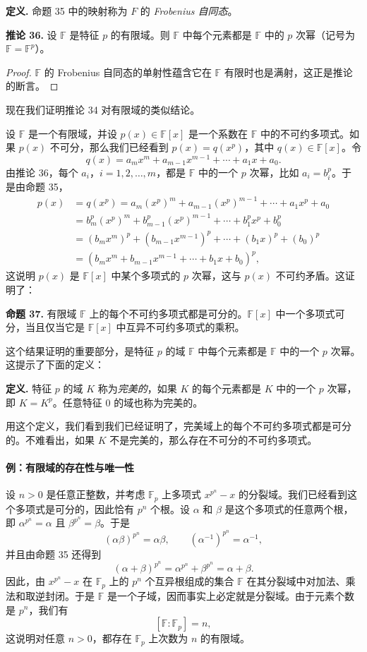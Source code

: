 \noindent\textbf{定义.} 命题 35 中的映射称为 $F$ 的 \emph{Frobenius 自同态}。

\noindent\textbf{推论 36.} 设 $\mathbb F$ 是特征 $p$ 的有限域。则 $\mathbb F$ 中每个元素都是 $\mathbb F$ 中的 $p$ 次幂（记号为 $\mathbb F=\mathbb F^p$）。

\begin{proof}
	$\mathbb F$ 的 Frobenius 自同态的单射性蕴含它在 $\mathbb F$ 有限时也是满射，这正是推论的断言。
\end{proof}

现在我们证明推论 34 对有限域的类似结论。

设 $\mathbb F$ 是一个有限域，并设 $p(x)\in\mathbb F[x]$ 是一个系数在 $\mathbb F$ 中的不可约多项式。如果 $p(x)$ 不可分，那么我们已经看到 $p(x)=q(x^p)$，其中 $q(x)\in\mathbb F[x]$。令
\[
q(x)=a_mx^m+a_{m-1}x^{m-1}+\cdots+a_1x+a_0.
\]
由推论 36，每个 $a_i$，$i=1,2,\ldots,m$，都是 $\mathbb F$ 中的一个 $p$ 次幂，比如 $a_i=b_i^p$。于是由命题 35，
\begin{align*}
	p(x)&=q(x^p)=a_m(x^p)^m+a_{m-1}(x^p)^{m-1}+\cdots+a_1x^p+a_0 \\
	&=b_m^p(x^p)^m+b_{m-1}^p(x^p)^{m-1}+\cdots+b_1^px^p+b_0^p \\
	&=(b_mx^m)^p+(b_{m-1}x^{m-1})^p+\cdots+(b_1x)^p+(b_0)^p \\
	&=(b_mx^m+b_{m-1}x^{m-1}+\cdots+b_1x+b_0)^p,
\end{align*}
这说明 $p(x)$ 是 $\mathbb F[x]$ 中某个多项式的 $p$ 次幂，这与 $p(x)$ 不可约矛盾。这证明了：

\noindent\textbf{命题 37.} 有限域 $\mathbb F$ 上的每个不可约多项式都是可分的。$\mathbb F[x]$ 中一个多项式可分，当且仅当它是 $\mathbb F[x]$ 中互异不可约多项式的乘积。

这个结果证明的重要部分，是特征 $p$ 的域 $\mathbb F$ 中每个元素都是 $\mathbb F$ 中的一个 $p$ 次幂。这提示了下面的定义：

\noindent\textbf{定义.} 特征 $p$ 的域 $K$ 称为\emph{完美的}，如果 $K$ 的每个元素都是 $K$ 中的一个 $p$ 次幂，即 $K=K^p$。任意特征 $0$ 的域也称为完美的。

用这个定义，我们看到我们已经证明了，完美域上的每个不可约多项式都是可分的。不难看出，如果 $K$ 不是完美的，那么存在不可分的不可约多项式。

\paragraph{例：有限域的存在性与唯一性}
设 $n>0$ 是任意正整数，并考虑 $\mathbb F_p$ 上多项式 $x^{p^n}-x$ 的分裂域。我们已经看到这个多项式是可分的，因此恰有 $p^n$ 个根。设 $\alpha$ 和 $\beta$ 是这个多项式的任意两个根，即 $\alpha^{p^n}=\alpha$ 且 $\beta^{p^n}=\beta$。于是
\[
(\alpha\beta)^{p^n}=\alpha\beta,
\qquad
(\alpha^{-1})^{p^n}=\alpha^{-1},
\]
并且由命题 35 还得到
\[
(\alpha+\beta)^{p^n}=\alpha^{p^n}+\beta^{p^n}=\alpha+\beta.
\]
因此，由 $x^{p^n}-x$ 在 $\mathbb F_p$ 上的 $p^n$ 个互异根组成的集合 $\mathbb F$ 在其分裂域中对加法、乘法和取逆封闭。于是 $\mathbb F$ 是一个子域，因而事实上必定就是分裂域。由于元素个数是 $p^n$，我们有
\[
[\mathbb F:\mathbb F_p]=n,
\]
这说明对任意 $n>0$，都存在 $\mathbb F_p$ 上次数为 $n$ 的有限域。

